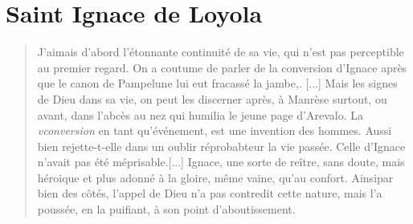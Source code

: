 \chapter{Saint Ignace de Loyola}


\begin{quote}
    J'aimais d'abord l'étonnante continuité de sa vie, qui n'est pas perceptible au premier regard. On a coutume de parler de la conversion d'Ignace après que le canon de Pampelune lui eut fracassé la jambe,. [...] Mais les signes de Dieu dans sa vie, on peut les discerner après, à Manrèse surtout, ou avant, dans l'abcès au nez qui humilia le jeune page d'Arevalo. La \textit{vconversion} en tant qu'événement, est une invention des hommes. Aussi bien rejette-t-elle dans un oublir réprobabteur la vie passée. Celle d'Ignace n'avait pas été méprisable.[...] Ignace, une sorte de reître, sans doute, mais héroique et plus adonné à la gloire, même vaine, qu'au confort. Ainsipar bien des côtés, l'appel de Dieu n'a pas contredit cette nature, mais l'a poussée, en la puifiant, à son point d'aboutissement. \cite[p. 164]{Sureau:inigo}  
\end{quote}